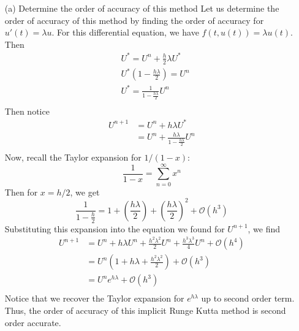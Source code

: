 \documentclass{article}
\begin{document}
\begin{enumerate}
    \item[(a)] Determine the order of accuracy of this method
    \newline\newline
    Let us determine the order of accuracy of this method by finding the order of accuracy for $u'(t) = \lambda u$. For this differential equation, we have $f(t,u(t)) = \lambda u(t)$. Then 
    \begin{align*}
        &U^* = U^n + \frac{h}{2}\lambda U^* \\
        &U^*\left(1 - \frac{h\lambda}{2}\right) = U^n \\
        &U^* = \frac{1}{1 - \frac{h\lambda}{2}} U^n \\
    \end{align*}
    Then notice
    \begin{align*}
        U^{n+1} &= U^n + h\lambda U^* \\
        &= U^n + \frac{h\lambda}{1 - \frac{h\lambda}{2}} U^n \\
    \end{align*}
    Now, recall the Taylor expansion for $1/(1-x)$:
    \[\frac{1}{1-x} = \sum_{n=0}^{\infty} x^n\]
    Then for $x = h/2$, we get
    \[\frac{1}{1 - \frac{h}{2}} = 1 + \left(\frac{h\lambda}{2}\right) + \left(\frac{h\lambda}{2}\right)^2 + \mathcal{O}(h^3)\]
    Substituting this expansion into the equation we found for $U^{n+1}$, we find
    \begin{align*}
        U^{n+1} &= U^n + h\lambda U^n + \frac{h^2 \lambda^2}{2} U^n + \frac{h^3\lambda^3}{4}U^n + \mathcal{O}(h^4) \\
        &= U^n\left(1 + h\lambda + \frac{h^2\lambda^2}{2}\right) + \mathcal{O}(h^3) \\
        &= U^ne^{h\lambda} + \mathcal{O}(h^3) \\
    \end{align*}
    Notice that we recover the Taylor expansion for $e^{h\lambda}$ up to second order term. Thus, the order of accuracy of this implicit Runge Kutta method is second order accurate.
    

\end{enumerate}
\end{document}
